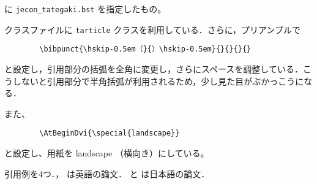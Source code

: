 \documentclass[10pt]{tarticle}
\begin{document}
\verb|| に \verb|jecon_tategaki.bst| を指定したもの。
\vspace*{1em}

クラスファイルに \texttt{tarticle} クラスを利用している．さらに，プリアンプルで
\begin{verbatim}
        \bibpunct{\hskip-0.5em（}{）\hskip-0.5em}{}{}{}{}
\end{verbatim}
と設定し，引用部分の括弧を全角に変更し，さらにスペースを調整している．こ
うしないと引用部分で半角括弧が利用されるため，少し見た目がぶかっこうにな
る．

また、
\begin{verbatim}
        \AtBeginDvi{\special{landscape}}
\end{verbatim}
と設定し、用紙を landscape （横向き）にしている。
\vspace*{2em}

引用例を4つ．\citet{ishikawa03:_green_gas_emiss_contr_open_econom}，
\citet{takeda06:_cge_analy_welfar_effec_trade} は英語の論文．
\citet{oyama99:_mark_stru} と \citet{kuroda97jp:keo} は日本語の論文．

\nocite{*}




% 
\end{document}
